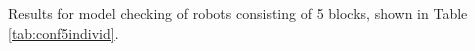 %

Results for model checking of robots consisting of 5 blocks,  
shown in Table \ref{tab:conf5individ}.

